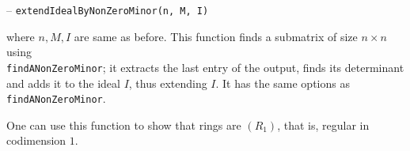 \documentclass[11pt]{amsart}
\theoremstyle{definition}
\begin{document}
\vspace{0.5em}
-- {\tt extendIdealByNonZeroMinor(n, M, I)} 

\vspace{0.5em}
\noindent where $n,M,I$ are same as before. This function finds a submatrix of size $n\times n$ using \\{\tt findANonZeroMinor};  
it extracts the last entry of the output, finds its determinant and
adds it to the ideal $I$, thus extending $I$.   It has the same options as {\tt findANonZeroMinor}.




\begin{comment}~~
  
  ~~
  
  {{\small\color{blue}
\begin{verbatim}
i2 : R = ZZ/5[x, y, z];
i3 : I = ideal(random(3, R) - 2, random(2, R))
                3    2       2     3     2              2       2     3
o3 = ideal (- 2x  + x y - x*y  - 2y  - 2x z + 2x*y*z + y z + y*z  - 2z 
-------------------------------------------------------------------
         2            2                 2
- 2, - 2x  - 2x*y + 2y  + x*z - 2y*z - z )
o3 : Ideal of R
i4 : M = jacobian(I)
o4 = {1} | -x2+2xy-y2+xz+2yz    x-2y+z   |
     {1} | x2-2xy-y2+2xz+2yz+z2 -2x-y-2z |
     {1} | -2x2+2xy+y2+2yz-z2   x-2y-2z  |
             3       2
o4 : Matrix R  <--- R
i5 : extendIdealByNonZeroMinor(2, M, I, Strategy => LinearIntersection)
                3    2       2     3     2              2       2     3
o5 = ideal (- 2x  + x y - x*y  - 2y  - 2x z + 2x*y*z + y z + y*z  - 2z 
-------------------------------------------------------------------
         2            2                 2   3    2        2    3  
- 2, - 2x  - 2x*y + 2y  + x*z - 2y*z - z , x  + x y + 2x*y  - y  +
-------------------------------------------------------------------
  2       2    3
2x z + y*z  - z )
o5 : Ideal of R
\end{verbatim}}	
    }}	
\end{comment}

One can use this function to show that rings are $(R_1)$, that is, regular in codimension $1$.
\end{document}
